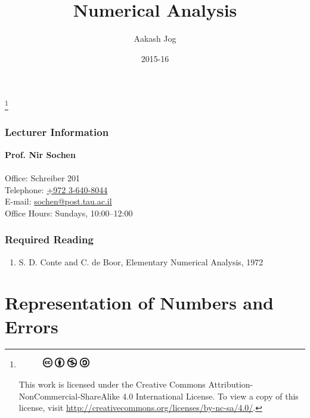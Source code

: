 \documentclass[fleqn, a4paper, 12pt, twoside, titlepage]{article}
\title{Numerical Analysis}
\author{Aakash Jog}
\date{2015-16}
\theoremstyle{definition}
\theoremstyle{theorem}
\newcommand\blfootnote[1]{%
	\begingroup
	\renewcommand\thefootnote{}\footnote{#1}%
	\addtocounter{footnote}{-1}%
	\endgroup
}
\begin{document}
\maketitle

\blfootnote
{	
	\begin{figure}[H]
		\includegraphics[height = 12pt]{cc.eps}
		\includegraphics[height = 12pt]{by.eps}
		\includegraphics[height = 12pt]{nc.eps}
		\includegraphics[height = 12pt]{sa.eps}
	\end{figure}
	This work is licensed under the Creative Commons Attribution-NonCommercial-ShareAlike 4.0 International License. To view a copy of this license, visit \url{http://creativecommons.org/licenses/by-nc-sa/4.0/}.
} %

\tableofcontents

\newpage
\section{Lecturer Information}

\textbf{Prof. Nir Sochen}\\
~\\
Office: Schreiber 201\\
Telephone: \href{tel:+972 3-640-8044}{+972 3-640-8044}\\
E-mail: \href{mailto:sochen@post.tau.ac.il}{sochen@post.tau.ac.il}\\
Office Hours: Sundays, 10:00--12:00

\section{Required Reading}

\begin{enumerate}
	\item S. D. Conte and C. de Boor, Elementary Numerical Analysis, 1972
\end{enumerate}

\newpage
\part{Representation of Numbers and Errors}
\end{document}
